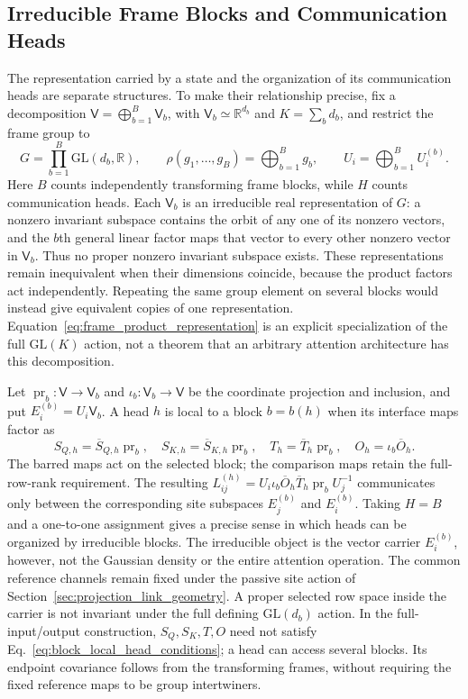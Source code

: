\documentclass[twoside,11pt]{article}
\begin{document}
\subsection{Irreducible Frame Blocks and Communication Heads}
\label{sec:heads_irreps}

The representation carried by a state and the organization of its communication heads are separate structures. To make their relationship precise, fix a decomposition $\mathsf V=\bigoplus_{b=1}^{B}\mathsf V_b$, with $\mathsf V_b\simeq\mathbb R^{d_b}$ and $K=\sum_bd_b$, and restrict the frame group to
\begin{equation}
G=\prod_{b=1}^{B}\mathrm{GL}(d_b,\mathbb R),\qquad
\rho(g_1,\ldots,g_B)=\bigoplus_{b=1}^{B}g_b,\qquad
U_i=\bigoplus_{b=1}^{B}U_i^{(b)}.
\label{eq:frame_product_representation}
\end{equation}
Here $B$ counts independently transforming frame blocks, while $H$ counts communication heads. Each $\mathsf V_b$ is an irreducible real representation of $G$: a nonzero invariant subspace contains the orbit of any one of its nonzero vectors, and the $b$th general linear factor maps that vector to every other nonzero vector in $\mathsf V_b$. Thus no proper nonzero invariant subspace exists. These representations remain inequivalent when their dimensions coincide, because the product factors act independently. Repeating the same group element on several blocks would instead give equivalent copies of one representation. Equation~\eqref{eq:frame_product_representation} is an explicit specialization of the full $\mathrm{GL}(K)$ action, not a theorem that an arbitrary attention architecture has this decomposition.

Let $\operatorname{pr}_b:\mathsf V\to\mathsf V_b$ and $\iota_b:\mathsf V_b\to\mathsf V$ be the coordinate projection and inclusion, and put $E_i^{(b)}=U_i\mathsf V_b$. A head $h$ is local to a block $b=b(h)$ when its interface maps factor as
\begin{equation}
S_{Q,h}=\overline S_{Q,h}\operatorname{pr}_b,\quad
S_{K,h}=\overline S_{K,h}\operatorname{pr}_b,\quad
T_h=\overline T_h\operatorname{pr}_b,\quad
O_h=\iota_b\overline O_h.
\label{eq:block_local_head_conditions}
\end{equation}
The barred maps act on the selected block; the comparison maps retain the full-row-rank requirement. The resulting $L_{ij}^{(h)}=U_i\iota_b\overline O_h\overline T_h\operatorname{pr}_bU_j^{-1}$ communicates only between the corresponding site subspaces $E_j^{(b)}$ and $E_i^{(b)}$. Taking $H=B$ and a one-to-one assignment gives a precise sense in which heads can be organized by irreducible blocks. The irreducible object is the vector carrier $E_i^{(b)}$, however, not the Gaussian density or the entire attention operation. The common reference channels remain fixed under the passive site action of Section~\ref{sec:projection_link_geometry}. A proper selected row space inside the carrier is not invariant under the full defining $\mathrm{GL}(d_b)$ action. In the full-input/output construction, $S_Q,S_K,T,O$ need not satisfy Eq.~\eqref{eq:block_local_head_conditions}; a head can access several blocks. Its endpoint covariance follows from the transforming frames, without requiring the fixed reference maps to be group intertwiners.
\end{document}
